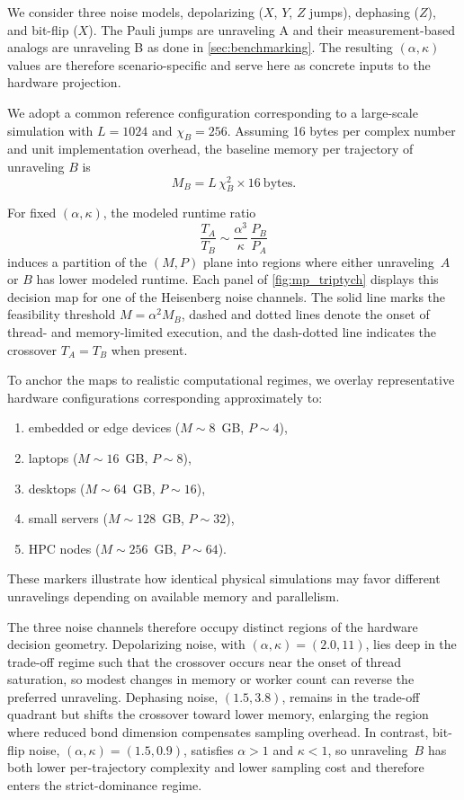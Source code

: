 \documentclass[aps, pra, superscriptaddress, reprint, floatfix]{revtex4-2}
\theoremstyle{plain}
\begin{document}
We consider three noise models, depolarizing ($X$, $Y$, $Z$ jumps), dephasing ($Z$), and bit-flip ($X$). The Pauli jumps are unraveling A and their measurement-based analogs are unraveling B as done in \cref{sec:benchmarking}.
The resulting $(\alpha,\kappa)$ values are therefore scenario-specific and serve here as concrete inputs to the hardware projection.

We adopt a common reference configuration corresponding to a large-scale simulation with $L=1024$ and $\chi_B=256$. Assuming 16 bytes per complex number and unit implementation overhead, the baseline memory per trajectory of unraveling $B$ is
\begin{equation}
M_B = L\,\chi_B^2 \times 16~\mathrm{bytes}.
\end{equation}

For fixed $(\alpha,\kappa)$, the modeled runtime ratio
\begin{equation}
\frac{T_A}{T_B} \sim \frac{\alpha^3}{\kappa}\,\frac{P_B}{P_A}
\end{equation}
induces a partition of the $(M,P)$ plane into regions where either unraveling~$A$ or $B$ has lower modeled runtime. Each panel of \cref{fig:mp_triptych} displays this decision map for one of the Heisenberg noise channels.
The solid line marks the feasibility threshold $M=\alpha^2 M_B$, dashed and dotted lines denote the onset of thread- and memory-limited execution, and the dash-dotted line indicates the crossover $T_A=T_B$ when present.

To anchor the maps to realistic computational regimes, we overlay representative hardware configurations corresponding approximately to:
\begin{enumerate}
    \item embedded or edge devices ($M\sim8$~GB, $P\sim4$),
    \item laptops ($M\sim16$~GB, $P\sim8$),
    \item desktops ($M\sim64$~GB, $P\sim16$),
    \item small servers ($M\sim128$~GB, $P\sim32$),
    \item HPC nodes ($M\sim256$~GB, $P\sim64$).
\end{enumerate}
These markers illustrate how identical physical simulations may favor different unravelings depending on available memory and parallelism.

The three noise channels therefore occupy distinct regions of the hardware decision geometry. Depolarizing noise, with $(\alpha,\kappa)=(2.0,11)$, lies deep in the trade-off regime such that the crossover occurs near the onset of thread saturation, so modest changes in memory or worker count can reverse the preferred unraveling. Dephasing noise, $(1.5,3.8)$, remains in the trade-off quadrant but shifts the crossover toward lower memory, enlarging the region where reduced bond dimension compensates sampling overhead.
In contrast, bit-flip noise, $(\alpha,\kappa)=(1.5,0.9)$, satisfies $\alpha>1$ and $\kappa<1$, so unraveling~$B$ has both lower per-trajectory complexity and lower sampling cost and therefore enters the strict-dominance regime.
\end{document}
